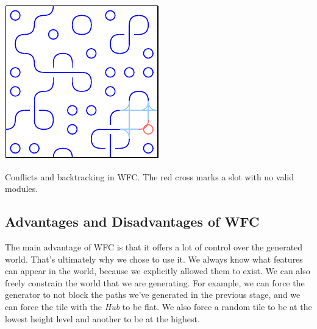 \begin{center}
\begin{minipage}{.31\textwidth}
         \label{fig:wfc-dead-end}
    \end{minipage}%
    \begin{minipage}{.31\textwidth}
        \centering
        \includegraphics[width=0.95\linewidth]{img/WFC backtracking after.pdf}
         \label{fig:wfc-after-backtracking}
    \end{minipage}
    \caption{Conflicts and backtracking in WFC. The red cross marks a slot with no valid modules.}
    \label{fig:wfc-backtracking}
\end{center}

\subsection{Advantages and Disadvantages of WFC}

The main advantage of WFC is that it offers a lot of control over the generated world.
That's ultimately why we chose to use it.
We always know what features can appear in the world, because we explicitly allowed them to exist.
We can also freely constrain the world that we are generating.
For example, we can force the generator to not block the paths we've generated in the previous stage, and we can force the tile with the \emph{Hub} to be flat.
We also force a random tile to be at the lowest height level and another to be at the highest.

